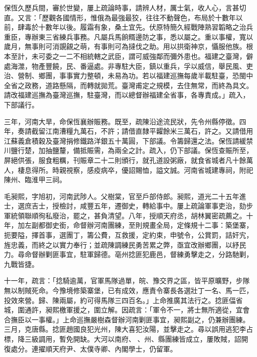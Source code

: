 \begin{pinyinscope}
保恆久歷兵間，審於世變，屢上疏論時事，請辨人材，厲士氣，收人心，言甚切直。又言：「歷觀各國情形，惟俄為最強最狡，往往不動聲色，布局於十數年以前，肆毒於十數年以後。履霜有象，桑土宜先。伏原特簡久經戰陣熟習韜略之治兵重臣，專辦東三省練兵事務。凡屬兵馬餉糈邊防之事，悉以屬之。重以事權，寬以歲月，無事則可消覬覦之萌，有事則可為撻伐之助。用以拱衛神京，懾服他族。根本至計，未可委之一二不相統轄之武臣，謂可威強鄰而彌外患也。福建之臺灣，僻處海澨，物產豐饒，民、番逼處。非專駐大臣，鎮以重兵，孚以威信，舉民風、吏治、營制、鄉團，事事實力整頓，未易為功。若以福建巡撫每歲半載駐臺，恐閩中全省之政務，道路懸隔，而轉就拋荒。臺灣甫定之規模，去住無常，而終為具文。請改福建巡撫為臺灣巡撫，駐臺灣，而以總督辦福建全省事，各專責成。」疏入，下部議行。

三年，河南大旱，命保恆襄辦賑務。既至，疏陳沿途流民狀，先令州縣停徵。四年，奏請截留江南漕糧九萬石，不許；請借直隸平糶餘米三萬石，許之。又請借用江蘇義倉積穀及臺灣捐修鐵路洋銀五十萬圓，下部議。令籌歸還之法。保恆請緩禁川鹽行楚，加抽鹽釐，備抵賑需，為兩全之計。疏入，仍下部議。保恆查賑所至，屏絕供張，服食粗糲，刊賑章二十二則頒行，就孔道設粥廠，就食省城者凡十餘萬人，棲息得所。時親視察，感疫病卒，優詔賜恤，謚文誠。河南省城建專祠，附祀陳州、臨淮甲三祠。

毛昶熙，字旭初，河南武陟人。父樹棠，官至戶部侍郎。昶熙，道光二十五年進士，選庶吉士，授檢討，咸豐五年，遷御史，轉給事中。屢上疏論軍事吏治，劾步軍統領聯順徇私廢治，罷之，甚負清望。八年，授順天府丞，胡林翼密疏薦之。十年，加左副都御史銜，命督辦河南團練，至則規畫全局，定條規十二事：築堡寨，扼要隘，擇首事，選團丁，籌公費，互救援，定約束，申號令，公賞罰，詰奸宄，旌忠義，而終之以實力奉行；並疏陳調練民勇苦累之弊，亟宜改辦鄉團，以紓民力。尋命督辦剿匪事宜，駐軍歸德。亳州捻匪犯鹿邑，督練勇擊走之，分路馳剿，九戰皆捷。

十一年，疏言：「捻騎逾萬，官軍馬隊過單，皖、豫交界之區，皆平原曠野，步隊無以制賊死命。今豫境修築寨堡，已有成效，應責令寨長各選壯丁一名、馬一匹，投效來營。歸、陳兩屬，約可得馬隊三四百名。」上命推廣其法行之。捻匪偪省城，圍通許，昶熙檄軍援之，圍立解。因疏言：「軍令不一，將士無所適從，宜會合撫臣以一事權。」上命巡撫嚴樹森督辦河南剿匪事宜，昶熙副之，仍兼辦團練。三月，克唐縣。捻匪趙國良犯光州，陳大喜犯汝陽，並擊走之。尋以誤用逃犯李占標，降三級調用，暫免開缺。大河以南府、、州、縣團練皆成立，屢敗賊，詔開復處分。連擢順天府尹、太僕寺卿、內閣學士，仍留軍。


\end{pinyinscope}
